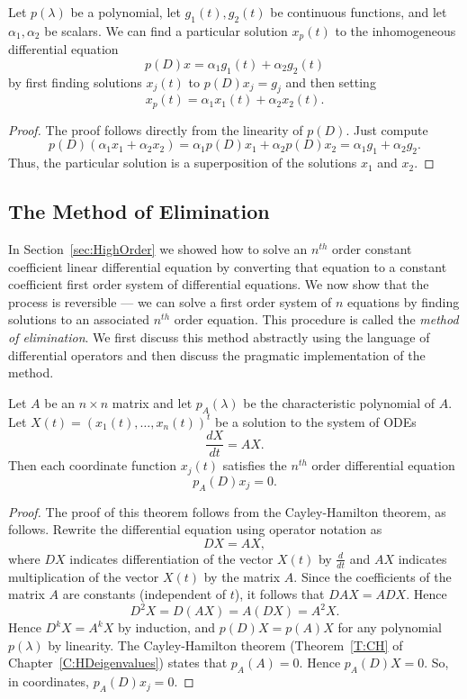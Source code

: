 \documentclass{ximera}
\begin{document}
\begin{lemma}  \label{L:inhsup}
Let $p(\lambda)$ be a polynomial, let $g_1(t),g_2(t)$ be continuous 
functions, and let $\alpha_1,\alpha_2$ be scalars.  We can find a particular 
solution $x_p(t)$ to the inhomogeneous differential equation
\[
p(D)x = \alpha_1g_1(t) + \alpha_2g_2(t)
\]
by first finding solutions $x_j(t)$ to $p(D)x_j = g_j$ and then setting 
\[
x_p(t) = \alpha_1x_1(t) + \alpha_2x_2(t).
\]
\end{lemma}

\begin{proof}  The proof follows directly from the linearity of $p(D)$.  Just 
compute
\[
p(D)(\alpha_1x_1 + \alpha_2x_2) = \alpha_1p(D)x_1 + 
\alpha_2p(D)x_2 = \alpha_1g_1 + \alpha_2g_2.
\]
Thus, the particular solution is a superposition of the solutions $x_1$ and
$x_2$.  \end{proof}

\subsection*{The Method of Elimination}

In Section~\ref{sec:HighOrder} we showed how to solve an $n^{th}$ order 
constant coefficient linear differential equation by converting that equation 
to a constant coefficient first order system of differential equations.  We 
now show that the process is reversible --- we can solve a first order 
system of $n$ equations by finding solutions to an associated $n^{th}$ order 
equation.  This procedure is called the {\em method of elimination\/}.
  We first discuss this method abstractly using 
the language of differential operators and then discuss the pragmatic 
implementation of the method.

\begin{thm}  \label{T:Elimination}
Let $A$ be an $n\times n$ matrix and let $p_A(\lambda)$ be the characteristic 
polynomial of $A$.  Let $X(t)=(x_1(t),\ldots,x_n(t))^t$ be a solution to the 
system of ODEs 
\[
\frac{dX}{dt} = AX.
\]
Then each coordinate function $x_j(t)$ satisfies the $n^{th}$ order 
differential equation
\begin{equation}  \label{E:Elimination}
p_A(D)x_j = 0.
\end{equation}
\end{thm}

\begin{proof}  The proof of this theorem follows from the Cayley-Hamilton 
theorem, as follows.   Rewrite the differential equation using operator 
notation as  
\[
DX = AX,
\]
where $DX$ indicates differentiation of the vector $X(t)$ by $\frac{d}{dt}$ 
and $AX$ indicates multiplication of the vector $X(t)$ by the matrix $A$.
Since the coefficients of the matrix $A$ are constants (independent of $t$), 
it follows that $DAX=ADX$.  Hence
\[
D^2X = D(AX) = A(DX) = A^2X.
\]
Hence $D^kX = A^kX$ by induction, and $p(D)X = p(A)X$ for any polynomial $p(\lambda)$ by linearity.  The Cayley-Hamilton theorem (Theorem~\ref{T:CH} 
of Chapter~\ref{C:HDeigenvalues}) states that $p_A(A)=0$.  Hence $p_A(D)X=0$.  
So, in coordinates, $p_A(D)x_j=0$. \end{proof}
\end{document}
